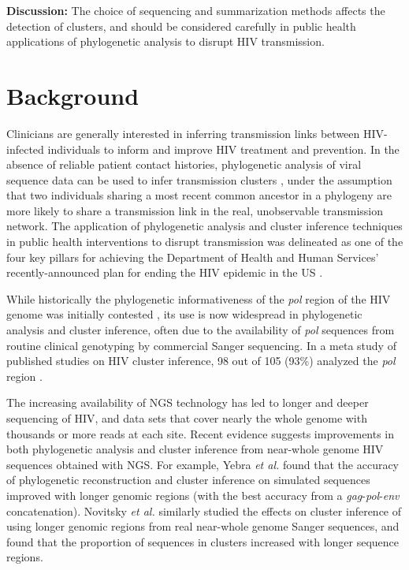 \documentclass[letterpaper]{article}
\begin{document}
\textbf{Discussion:} The choice of sequencing and summarization methods affects the detection of clusters, and should be considered carefully in public health applications of phylogenetic analysis to disrupt HIV transmission.

\section*{Background}

Clinicians are generally interested in inferring transmission links between HIV-infected individuals to inform and improve HIV treatment and prevention. In the absence of reliable patient contact histories, phylogenetic analysis of viral sequence data can be used to infer transmission clusters \parencite{leitner}, under the assumption that two individuals sharing a most recent common ancestor in a phylogeny are more likely to share a transmission link in the real, unobservable transmission network. The application of phylogenetic analysis and cluster inference techniques in public health interventions to disrupt transmission was delineated as one of the four key pillars for achieving the Department of Health and Human Services' recently-announced plan for ending the HIV epidemic in the US \parencite{fauci}.

While historically the phylogenetic informativeness of the \emph{pol} region of the HIV genome was initially contested \parencite{hue, sturmer}, its use is now widespread in phylogenetic analysis and cluster inference, often due to the availability of \emph{pol} sequences from routine clinical genotyping by commercial Sanger sequencing. In a meta study of published studies on HIV cluster inference, 98 out of 105 (93\%) analyzed the \emph{pol} region \parencite{hassan}.

The increasing availability of NGS technology has led to longer and deeper sequencing of HIV, and data sets that cover nearly the whole genome with thousands or more reads at each site. Recent evidence suggests improvements in both phylogenetic analysis and cluster inference from near-whole genome HIV sequences obtained with NGS. For example, Yebra \emph{et al.} \parencite{yebra} found that the accuracy of phylogenetic reconstruction and cluster inference on simulated sequences improved with longer genomic regions (with the best accuracy from a \emph{gag}-\emph{pol}-\emph{env} concatenation). Novitsky \emph{et al.} \parencite{novitsky} similarly studied the effects on cluster inference of using longer genomic regions from real near-whole genome Sanger sequences, and found that the proportion of sequences in clusters increased with longer sequence regions.
\end{document}
